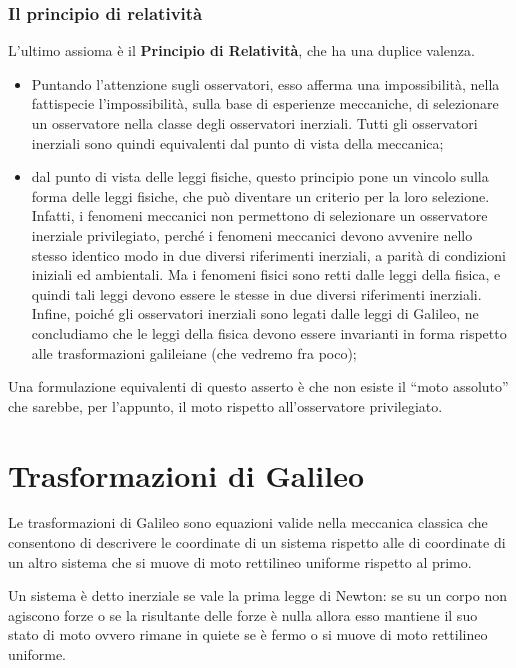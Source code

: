 \subsubsection{Il principio di relatività}
L’ultimo assioma è il \textbf{Principio di Relatività}, che ha una duplice valenza.
\begin{itemize}
 \item Puntando l'attenzione sugli osservatori, esso afferma una impossibilità,
nella fattispecie l’impossibilità, sulla base di esperienze meccaniche, di
selezionare un osservatore nella classe degli osservatori inerziali. Tutti
gli osservatori inerziali sono quindi equivalenti dal punto di vista della
meccanica;
\item dal punto di vista delle leggi fisiche, questo principio pone un vincolo
sulla forma delle leggi fisiche, che può diventare un
criterio per la loro selezione. Infatti, i fenomeni meccanici non
permettono di selezionare un osservatore inerziale privilegiato, perché
i fenomeni meccanici devono avvenire nello stesso identico modo in due diversi 
riferimenti inerziali, a parità di condizioni iniziali ed ambientali.
Ma i fenomeni fisici sono retti dalle leggi della fisica, e quindi tali leggi
devono essere le stesse in due diversi riferimenti inerziali. Infine, poiché
gli osservatori inerziali sono legati dalle leggi di Galileo, ne concludiamo
che le leggi della fisica devono essere invarianti in forma rispetto alle
trasformazioni galileiane (che vedremo fra poco);
\end{itemize}

Una formulazione equivalenti di questo asserto è che non esiste il ``moto assoluto'' che sarebbe, per l’appunto, il moto
rispetto all’osservatore privilegiato.

\section{Trasformazioni di Galileo}
Le trasformazioni di Galileo sono equazioni valide nella meccanica classica che consentono di descrivere le coordinate di un sistema rispetto 
alle di coordinate di un altro sistema che si muove di moto rettilineo uniforme rispetto al primo. 

Un sistema è detto inerziale se vale la prima legge di Newton: se su un corpo non agiscono forze o se la risultante delle forze è nulla allora esso mantiene il suo stato
di moto ovvero rimane in quiete se è fermo o si muove di moto rettilineo uniforme.

